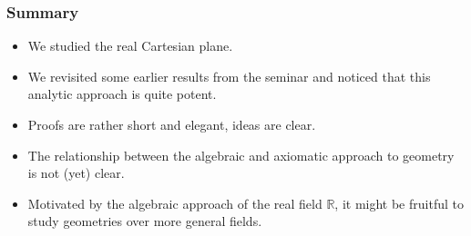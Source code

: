 \documentclass[compress,mathserif,serif]{beamer}
\begin{document}
\begin{frame}
\frametitle{Summary}
\begin{itemize}
\item We studied the real Cartesian plane.
\pause
\item We revisited some earlier results from the seminar and noticed that this analytic approach is quite potent.
\pause
\item Proofs are rather short and elegant, ideas are clear. 
\pause
\item The relationship between the algebraic and axiomatic approach to geometry is not (yet) clear.
\pause
\item Motivated by the algebraic approach of the real field $\mathbb{R}$, it might be fruitful to study geometries over more general fields. 
\end{itemize}
\end{frame}

\begin{frame}
\begin{center}
\Huge{}
\end{center}
\end{frame}
\end{document}
